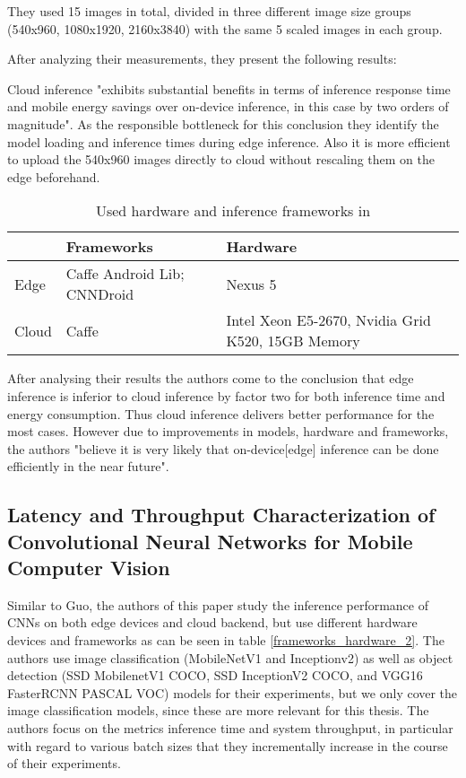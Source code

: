 They used 15 images in total, divided in three different image size groups (540x960, 1080x1920, 2160x3840) with the same 5 scaled images in each group.

After analyzing their measurements, they present the following results:

Cloud inference "exhibits substantial benefits
in terms of inference response time and mobile energy savings
over on-device inference, in this case by two orders of magnitude". As the responsible bottleneck for this conclusion they identify the model loading and inference times during edge inference.
Also it is more efficient to upload the 540x960 images directly to cloud without rescaling them on the edge beforehand.


\begin{table}[H]
\centering
\caption{Used hardware and inference frameworks in \cite{DBLP:conf/ic2e/Guo18}}
\begin{tabular}{@{}lll@{}}
\toprule
 & Frameworks & Hardware \\
 \midrule
Edge & Caffe Android Lib; CNNDroid & Nexus 5 \\
Cloud & Caffe & Intel Xeon E5-2670, Nvidia Grid K520, 15GB Memory\\
\bottomrule

\end{tabular}

\label{frameworks_hardware_1}
\end{table}
After analysing their results the authors come to the conclusion that edge inference is inferior to cloud inference by factor two for both inference time and energy consumption. Thus cloud inference delivers better performance for the most cases. However due to improvements in models, hardware and frameworks, the authors "believe it is
very likely that on-device[edge] inference can be done efficiently in the near future". 
\subsection{Latency and Throughput Characterization of Convolutional
Neural Networks for Mobile Computer Vision}
Similar to Guo, the authors of this paper study the inference performance of CNNs on both edge devices and cloud backend, but use different hardware devices and frameworks as can be seen in table \ref{frameworks_hardware_2}. 
The authors use image classification (MobileNetV1 and Inceptionv2) as well as object detection (SSD MobilenetV1 COCO, SSD InceptionV2 COCO,
and VGG16 FasterRCNN PASCAL VOC) models for their experiments, but we only cover the image classification models, since these are more relevant for this thesis.
The authors focus on the metrics inference time and system throughput, in particular with regard to various batch sizes that they incrementally increase in the course of their experiments.

